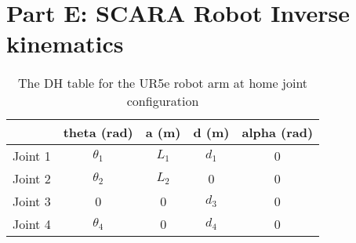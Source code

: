 \section{Part E: SCARA Robot Inverse kinematics}

\begin{table}[H]
    \centering
    \begin{tabular}{|c|c|c|c|c|}
        \hline
                & \textbf{theta (rad)} & \textbf{a (m)} & \textbf{d (m)} & \textbf{alpha (rad)} \\ \hline
        Joint 1 & $\theta_1$           & $L_1$          & $d_1$          & 0                    \\ \hline
        Joint 2 & $\theta_2$           & $L_2$          & 0              & 0                    \\ \hline
        Joint 3 & 0                    & 0              & $d_3$          & 0                    \\ \hline
        Joint 4 & $\theta_4$           & 0              & $d_4$          & 0                    \\ \hline
    \end{tabular}
    \caption{The DH table for the UR5e robot arm at home joint configuration}
    \label{table:Scara DH Table}
\end{table}


